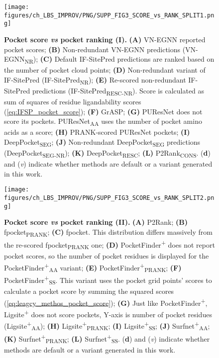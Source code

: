 \begin{figure}[htb!]
    \centering
    \texttt{[image: figures/ch\_LBS\_IMPROV/PNG/SUPP\_FIG3\_SCORE\_vs\_RANK\_SPLIT1.png]}
    \caption[Pocket score \textit{vs} pocket ranking (I)]{\textbf{Pocket score \textit{vs} pocket ranking (I).} \textbf{(A)} VN-EGNN reported pocket scores; \textbf{(B)} Non-redundant VN-EGNN predictions (VN-EGNN\textsubscript{NR}); \textbf{(C)} Default IF-SitePred predictions are ranked based on the number of pocket cloud points; \textbf{(D)} Non-redundant variant of IF-SitePred (IF-SitePred\textsubscript{NR}); \textbf{(E)} Re-scored non-redundant IF-SitePred predictions (IF-SitePred\textsubscript{RESC-NR}). Score is calculated as sum of squares of residue ligandability scores (\autoref{eq:IFSP_pocket_score}); \textbf{(F)} GrASP; \textbf{(G)} PUResNet does not score its pockets. PUResNet\textsubscript{AA} uses the number of pocket amino acids as a score; \textbf{(H)} PRANK-scored PUResNet pockets; \textbf{(I)} DeepPocket\textsubscript{SEG}; \textbf{(J)} Non-redundant DeepPocket\textsubscript{SEG} predictions (DeepPocket\textsubscript{SEG-NR}); \textbf{(K)} DeepPocket\textsubscript{RESC}; \textbf{(L)} P2Rank\textsubscript{CONS}. (\textbf{d}) and (\textit{v}) indicate whether methods are default or a variant generated in this work.}
    \label{fig:pocket_score_vs_rank1}
\end{figure}

\begin{figure}[htb!]
    \centering
    \texttt{[image: figures/ch\_LBS\_IMPROV/PNG/SUPP\_FIG3\_SCORE\_vs\_RANK\_SPLIT2.png]}
    \caption[Pocket score \textit{vs} pocket ranking (II)]{\textbf{Pocket score \textit{vs} pocket ranking (II).} \textbf{(A)} P2Rank; \textbf{(B)} fpocket\textsubscript{PRANK}; \textbf{(C)} fpocket. This distribution differs massively from the re-scored fpocket\textsubscript{PRANK} one; \textbf{(D)} PocketFinder\textsuperscript{+} does not report pocket scores, so the number of pocket residues is displayed for the PocketFinder\textsuperscript{+}\textsubscript{AA} variant; \textbf{(E)} PocketFinder\textsuperscript{+}\textsubscript{PRANK}; \textbf{(F)} PocketFinder\textsuperscript{+}\textsubscript{SS}. This variant uses the pocket grid points’ scores to calculate a pocket score by summing the squared scores (\autoref{eq:leagcy_methos_pocket_score}); \textbf{(G)} Just like PocketFinder\textsuperscript{+}, Ligsite\textsuperscript{+} does not score pockets, Y-axis is number of pocket residues (Ligsite\textsuperscript{+}\textsubscript{AA}); \textbf{(H)} Ligsite\textsuperscript{+}\textsubscript{PRANK}; \textbf{(I)} Ligsite\textsuperscript{+}\textsubscript{SS}; \textbf{(J)} Surfnet\textsuperscript{+}\textsubscript{AA}; \textbf{(K)} Surfnet\textsuperscript{+}\textsubscript{PRANK}; \textbf{(L)} Surfnet\textsuperscript{+}\textsubscript{SS}. (\textbf{d}) and (\textit{v}) indicate whether methods are default or a variant generated in this work.}
    \label{fig:pocket_score_vs_rank2}
\end{figure}


